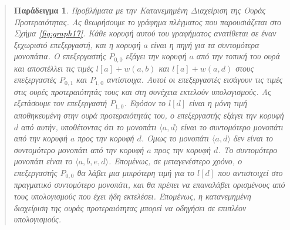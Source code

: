 \documentclass[12pt,a4paper]{article}
\newtheorem{paradeigma}{Παράδειγμα}
\begin{document}
\begin{quote}
\begin{paradeigma} \label{par:1} Προβλήματα με την Κατανεμημένη Διαχείριση της Ουράς Προτεραιότητας.
Ας θεωρήσουμε το γράφημα πλέγματος που παρουσιάζεται στο Σχήμα \ref{fig:graph17}.
Κάθε κορυφή αυτού του γραφήματος ανατίθεται σε έναν ξεχωριστό επεξεργαστή,
και η κορυφή $a$ είναι η πηγή για τα συντομότερα μονοπάτια. Ο
επεξεργαστής $P_{0,0}$ εξάγει την κορυφή $a$ από την τοπική του ουρά
και αποστέλλει τις τιμές $l[a] + w(a, b)$ και $l[a] + w(a, d)$ στους
επεξεργαστές $P_{0,1}$ και $P_{1,0}$ αντίστοιχα. Αυτοί οι επεξεργαστές
εισάγουν τις τιμές στις ουρές προτεραιότητάς τους και στη συνέχεια
εκτελούν υπολογισμούς. Ας εξετάσουμε τον επεξεργαστή $P_{1,0}$. Εφόσον
το $l[d]$ είναι η μόνη τιμή αποθηκευμένη στην ουρά προτεραιότητάς του,
ο επεξεργαστής εξάγει την κορυφή $d$ από αυτήν, υποθέτοντας ότι το
μονοπάτι $\langle a, d \rangle$ είναι το συντομότερο μονοπάτι από την
κορυφή $a$ προς την κορυφή $d$. Όμως το μονοπάτι $\langle a, d \rangle$
δεν είναι το συντομότερο μονοπάτι από την κορυφή $a$ προς την κορυφή
$d$. Το συντομότερο μονοπάτι είναι το $\langle a, b, e, d \rangle$.
Επομένως, σε μεταγενέστερο χρόνο, ο επεξεργαστής $P_{0,0}$ θα λάβει
μια μικρότερη τιμή για το $l[d]$ που αντιστοιχεί στο πραγματικό
συντομότερο μονοπάτι, και θα πρέπει να επαναλάβει ορισμένους από τους
υπολογισμούς που έχει ήδη εκτελέσει. Επομένως, η κατανεμημένη
διαχείριση της ουράς προτεραιότητας μπορεί να οδηγήσει σε επιπλέον
υπολογισμούς.
\end{paradeigma}
\end{quote}
\end{document}

